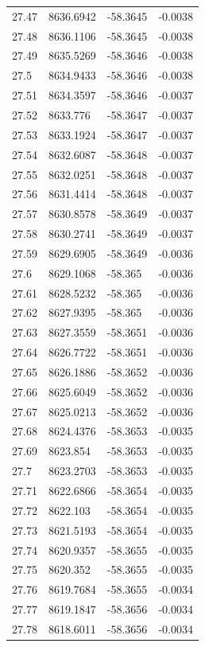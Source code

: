 \begin{table}[H]
\begin{tabular}{llll}
27.47 & 8636.6942 & -58.3645 & -0.0038 \\
27.48 & 8636.1106 & -58.3645 & -0.0038 \\
27.49 & 8635.5269 & -58.3646 & -0.0038 \\
27.5 & 8634.9433 & -58.3646 & -0.0038 \\
27.51 & 8634.3597 & -58.3646 & -0.0037 \\
27.52 & 8633.776 & -58.3647 & -0.0037 \\
27.53 & 8633.1924 & -58.3647 & -0.0037 \\
27.54 & 8632.6087 & -58.3648 & -0.0037 \\
27.55 & 8632.0251 & -58.3648 & -0.0037 \\
27.56 & 8631.4414 & -58.3648 & -0.0037 \\
27.57 & 8630.8578 & -58.3649 & -0.0037 \\
27.58 & 8630.2741 & -58.3649 & -0.0037 \\
27.59 & 8629.6905 & -58.3649 & -0.0036 \\
27.6 & 8629.1068 & -58.365 & -0.0036 \\
27.61 & 8628.5232 & -58.365 & -0.0036 \\
27.62 & 8627.9395 & -58.365 & -0.0036 \\
27.63 & 8627.3559 & -58.3651 & -0.0036 \\
27.64 & 8626.7722 & -58.3651 & -0.0036 \\
27.65 & 8626.1886 & -58.3652 & -0.0036 \\
27.66 & 8625.6049 & -58.3652 & -0.0036 \\
27.67 & 8625.0213 & -58.3652 & -0.0036 \\
27.68 & 8624.4376 & -58.3653 & -0.0035 \\
27.69 & 8623.854 & -58.3653 & -0.0035 \\
27.7 & 8623.2703 & -58.3653 & -0.0035 \\
27.71 & 8622.6866 & -58.3654 & -0.0035 \\
27.72 & 8622.103 & -58.3654 & -0.0035 \\
27.73 & 8621.5193 & -58.3654 & -0.0035 \\
27.74 & 8620.9357 & -58.3655 & -0.0035 \\
27.75 & 8620.352 & -58.3655 & -0.0035 \\
27.76 & 8619.7684 & -58.3655 & -0.0034 \\
27.77 & 8619.1847 & -58.3656 & -0.0034 \\
27.78 & 8618.6011 & -58.3656 & -0.0034 \\

\end{tabular}
\end{table}
